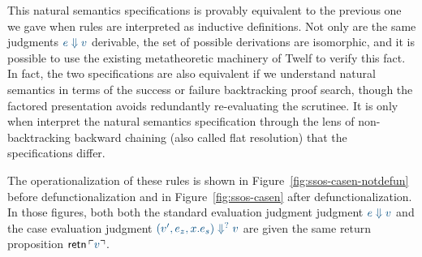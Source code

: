 This natural semantics specifications is provably equivalent to the
previous one we gave when rules are interpreted as inductive
definitions.  Not only are the same judgments $\obj{e \Downarrow v}$
derivable, the set of possible derivations are isomorphic, and it is
possible to use the existing metatheoretic machinery of Twelf to
verify this fact. In fact, the two specifications are also equivalent
if we understand natural semantics in terms of the success or failure
backtracking proof search, though the factored presentation
avoids redundantly re-evaluating the scrutinee. 
It is only when interpret the natural semantics
specification through the lens of non-backtracking backward chaining
(also called flat resolution) that the specifications differ.

The operationalization of these rules is shown in 
Figure~\ref{fig:ssos-casen-notdefun} before defunctionalization
and in Figure~\ref{fig:ssos-casen} after defunctionalization.
In those figures, both  both the standard evaluation judgment
judgment $\obj{e \Downarrow v}$ and the case evaluation judgment
 $\obj{(v',e_z,x.e_s) \Downarrow^?v}$ are given the same return
proposition ${\sf retn}\,\interp{v}$. 





